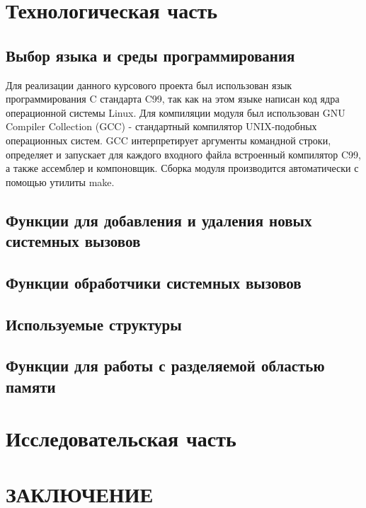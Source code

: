 \documentclass{bmstu}
\begin{document}
\chapter{Технологическая часть}
\section{Выбор языка и среды программирования}
Для реализации данного курсового проекта был использован язык программирования C стандарта C99, так как на этом языке написан код ядра операционной системы Linux. Для компиляции модуля был использован GNU Compiler Collection (GCC) - стандартный компилятор UNIX-подобных операционных систем. GCC интерпретирует аргументы командной строки, определяет и запускает для каждого входного файла встроенный компилятор C99, а также ассемблер и компоновщик.
Сборка модуля производится автоматически с помощью утилиты make.

\section{Функции для добавления и удаления новых системных вызовов}%
\section{Функции обработчики системных вызовов}

\section{Используемые структуры}

\section{Функции для работы с разделяемой областью памяти}

\chapter{Исследовательская часть}

\chapter{ЗАКЛЮЧЕНИЕ}
\end{document}
